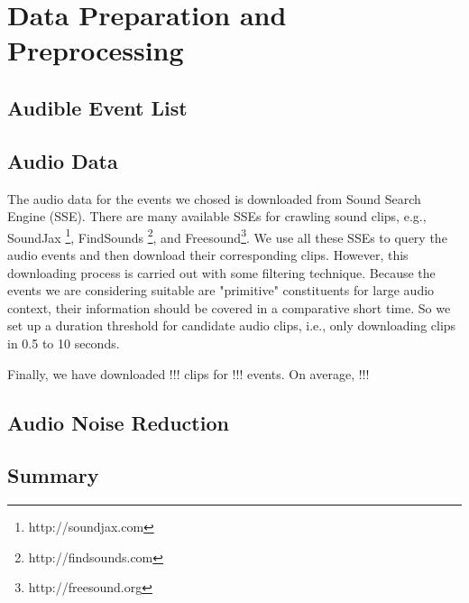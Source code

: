 \chapter{Data Preparation and Preprocessing}

\section{Audible Event List} 

\section{Audio Data}
The audio data for the events we chosed is downloaded from Sound Search Engine (SSE). 
There are many available SSEs for crawling sound clips, e.g., SoundJax \footnote{http://soundjax.com}, FindSounds \footnote{http://findsounds.com}, and Freesound\footnote{http://freesound.org}. 
We use all these SSEs to query the audio events and then download their corresponding clips. 
However, this downloading process is carried out with some filtering technique. 
Because the events we are considering suitable are "primitive" constituents for large audio context, their information should be covered in a comparative short time. 
So we set up a duration threshold for candidate audio clips, i.e., only downloading clips in 0.5 to 10 seconds.  

Finally, we have downloaded !!! clips for !!! events. On average, !!! 

\section{Audio Noise Reduction}

\section{Summary}
